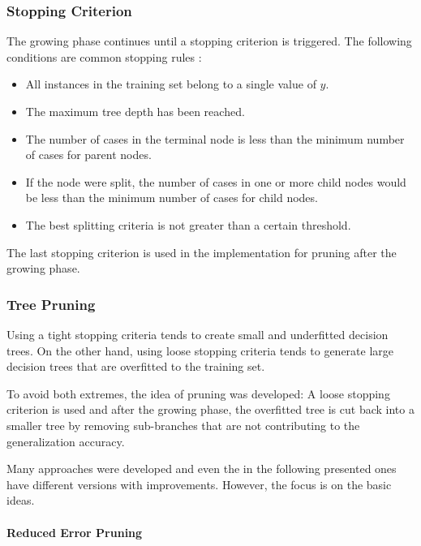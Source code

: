 \subsubsection{Stopping Criterion}

The growing phase continues until a stopping criterion is triggered. The following conditions are common stopping rules \cite[p. 63]{rokach2008data}:
\begin{itemize}
    \item All instances in the training set belong to a single value of $y$.
    \item The maximum tree depth has been reached.
    \item The number of cases in the terminal node is less than the minimum
number of cases for parent nodes.
    \item If the node were split, the number of cases in one or more child nodes
would be less than the minimum number of cases for child nodes.
    \item The best splitting criteria is not greater than a certain threshold.
\end{itemize}


\begin{remark}
    The last stopping criterion is used in the implementation for pruning after the growing phase.\label{stoppingcriterionimpl}
\end{remark}



\subsubsection{Tree Pruning}\label{treepruning}

Using a tight stopping criteria tends to create small and underfitted decision trees. On the other hand, using  loose stopping criteria tends to generate large decision trees that are overfitted to the training set. 

To avoid both extremes, the idea of pruning was developed: A loose stopping criterion is used and after the growing phase, the overfitted tree is cut back into a smaller tree by removing sub-branches that are not contributing to the generalization accuracy. 

Many approaches were developed and even the in the following presented ones have different versions with improvements. However, the focus is on the basic ideas. 


\paragraph{Reduced Error Pruning}

